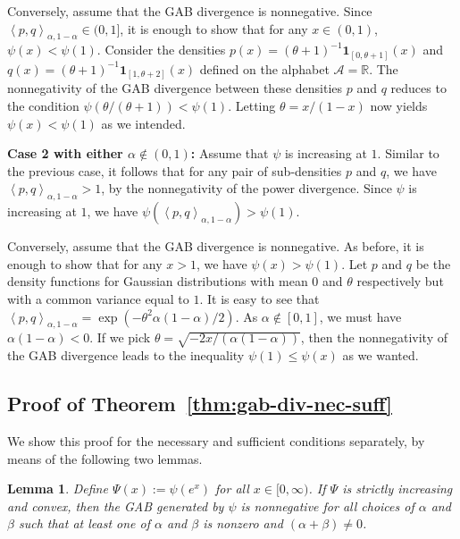 \documentclass[11pt]{article}
\theoremstyle{plain}
\newtheorem{lemma}[theorem]{Lemma}
\theoremstyle{remark}
\def\R{\mathbb{R}}
\newcommand{\Acal}{\mathcal{A}}
\newcommand{\ind}[1]{\boldsymbol{1}_{#1} }
\newcommand{\inner}[1]{\left\langle #1\right\rangle}
\begin{document}
Conversely, assume that the GAB divergence is nonnegative. Since $\inner{p, q}_{\alpha,1-\alpha} \in (0, 1]$, it is enough to show that for any $x \in (0, 1)$, $\psi(x) < \psi(1)$. Consider the densities $p(x) = (\theta+1)^{-1}\ind{[0, \theta+1]}(x)$ and $q(x) = (\theta+1)^{-1}\ind{[1, \theta+2]}(x)$ defined on the alphabet $\Acal = \R$. The nonnegativity of the GAB divergence between these densities $p$ and $q$ reduces to the condition $\psi(\theta/(\theta + 1)) < \psi(1)$. Letting $\theta = x/(1-x)$ now yields $\psi(x) < \psi(1)$ as we intended.

\noindent\textbf{Case 2 with either $\alpha \notin (0, 1)$:} Assume that $\psi$ is increasing at $1$. Similar to the previous case, it follows that for any pair of sub-densities $p$ and $q$, we have $\inner{p, q}_{\alpha,1-\alpha} > 1$, by the nonnegativity of the power divergence. Since $\psi$ is increasing at $1$, we have $\psi(\inner{p,q}_{\alpha,1-\alpha}) > \psi(1)$.

Conversely, assume that the GAB divergence is nonnegative. As before, it is enough to show that for any $x > 1$, we have $\psi(x) > \psi(1)$. Let $p$ and $q$ be the density functions for Gaussian distributions with mean $0$ and $\theta$ respectively but with a common variance equal to $1$. It is easy to see that $\inner{p, q}_{\alpha,1-\alpha} = \exp(-\theta^2\alpha(1-\alpha)/2)$. As $\alpha \notin [0,1]$, we must have $\alpha(1-\alpha) < 0$. If we pick $\theta = \sqrt{-2x/(\alpha(1-\alpha))}$, then the nonnegativity of the GAB divergence leads to the inequality $\psi(1) \leq \psi(x)$ as we wanted.

\subsection{Proof of Theorem~\ref{thm:gab-div-nec-suff}}\label{sec:appendix-proof-gab-nec-suff}

We show this proof for the necessary and sufficient conditions separately, by means of the following two lemmas.

\begin{lemma}\label{lem:gab-sufficient}
    Define $\Psi(x) := \psi(e^x)$ for all $x \in [0, \infty)$. If $\Psi$ is strictly increasing and convex, then the GAB generated by $\psi$ is nonnegative for all choices of $\alpha$ and $\beta$ such that at least one of $\alpha$ and $\beta$ is nonzero and $(\alpha + \beta) \neq 0$.
\end{lemma}
\end{document}
